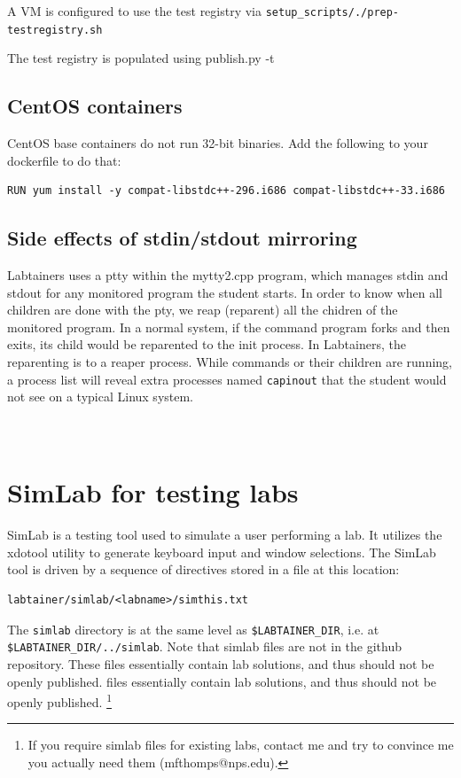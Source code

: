 \documentclass[12pt]{article}
\begin{document}
A VM is configured to use the test registry via {\tt setup\_scripts/./prep-testregistry.sh}

The test registry is populated using publish.py -t

\subsection {CentOS containers}
CentOS base containers do not run 32-bit binaries.  Add the following to your dockerfile to do that:
\begin{verbatim}
RUN yum install -y compat-libstdc++-296.i686 compat-libstdc++-33.i686
\end{verbatim}

\subsection{Side effects of stdin/stdout mirroring}
Labtainers uses a ptty within the mytty2.cpp program, which manages stdin and stdout for any monitored program the
student starts.  In order to know when all children are done with the pty, we reap (reparent) all the chidren of the monitored
program.  In a normal system, if the command program forks and then exits, its child would be reparented to the init process.
In Labtainers, the reparenting is to a reaper process.  While commands or their children are running, 
a process list will reveal extra processes named {\tt capinout} that the student would not see on a typical Linux system.

\newpage
\appendix
\section{\\SimLab for testing labs}
\label{testing}
SimLab is a testing tool used to simulate a user performing a lab.  
It utilizes the xdotool utility to
generate keyboard input and window selections.  The SimLab tool is driven by a 
sequence of directives stored in a file at this location:
\begin{verbatim}
labtainer/simlab/<labname>/simthis.txt
\end{verbatim}
The {\tt simlab} directory is at the same level as {\tt \$LABTAINER\_DIR}, i.e. at {\tt \$LABTAINER\_DIR/../simlab}.
Note that simlab files are not in the github repository.  These
files essentially contain lab solutions, and thus should not be openly published.
files essentially contain lab solutions, and thus should not be openly published.
\footnote{If you require simlab files for existing labs, contact me and try to convince
me you actually need them (mfthomps@nps.edu).}
\end{document}
